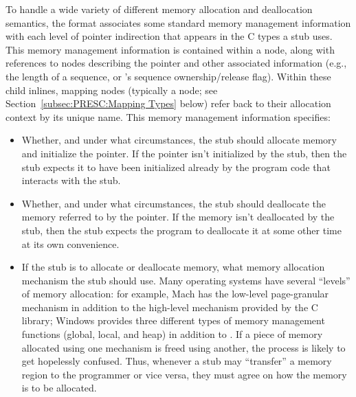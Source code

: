 To handle a wide variety of different memory allocation and deallocation
semantics, the \PRESC{} format associates some standard memory management
information with each level of pointer indirection that appears in the C types
a stub uses.  This memory management information is contained within a
 node, along with references to
 nodes describing the pointer and other associated
information (e.g., the length of a sequence, or \CORBA{}'s sequence
ownership/release flag).  Within these child inlines, \PRESC{} mapping nodes
(typically a  node; see
Section~\ref{subsec:PRESC:Mapping Types} below) refer back to their allocation context by
its unique name.  This memory management information specifies:

\begin{itemize}
  \item Whether, and under what circumstances, the stub should allocate memory
  and initialize the pointer.  If the pointer isn't initialized by the stub,
  then the stub expects it to have been initialized already by the program code
  that interacts with the stub.

  \item Whether, and under what circumstances, the stub should deallocate the
  memory referred to by the pointer.  If the memory isn't deallocated by the
  stub, then the stub expects the program to deallocate it at some other time
  at its own convenience.

  \item If the stub is to allocate or deallocate memory, what memory allocation
  mechanism the stub should use.  Many operating systems have several
  ``levels'' of memory allocation: for example, Mach has the low-level
  page-granular  mechanism in addition to the high-level
   mechanism provided by the C library; Windows provides
  three different types of memory management functions (global, local, and
  heap) in addition to .  If a piece of memory allocated
  using one mechanism is freed using another, the process is likely to get
  hopelessly confused.  Thus, whenever a stub may ``transfer'' a memory region
  to the programmer or vice versa, they must agree on how the memory is to be
  allocated.
\end{itemize}


